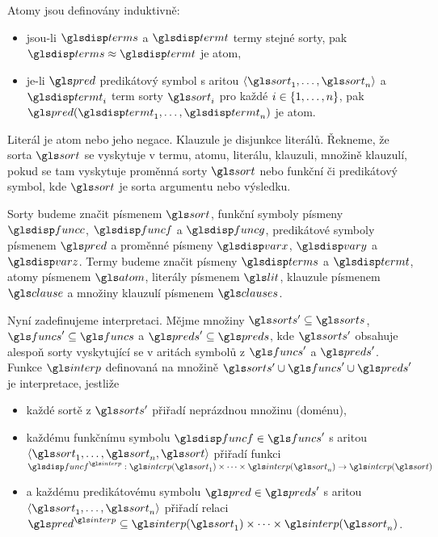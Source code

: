 Atomy jsou definovány induktivně:

\begin{itemize}
\item jsou-li $\termS$ a $\term$ termy stejné sorty,
  pak $\termS \approx \term$ je atom,
\item je-li $\pred$ predikátový symbol
  s aritou $\langle \sort_1 \comdots \sort_n \rangle$
  a $\term_i$ term sorty $\sort_i$ pro každé $i \in \{ 1 , \ldots, n \}$, pak
  $\pred(\term_1 \comdots \term_n)$ je atom.
\end{itemize}

Literál je atom nebo jeho negace. Klauzule je disjunkce literálů.
Řekneme, že sorta $\sort$ se vyskytuje v termu, atomu, literálu, klauzuli,
množině klauzulí, pokud se tam vyskytuje proměnná sorty $\sort$ nebo
funkční či predikátový symbol, kde $\sort$ je sorta argumentu nebo výsledku.


Sorty budeme značit písmenem $\sort$, funkční symboly písmeny
$\funcC$, $\func$ a $\funcG$, predikátové symboly písmenem $\pred$
a proměnné písmeny $\var$, $\varY$ a $\varZ$.
Termy budeme značit písmeny $\termS$ a $\term$, atomy písmenem $\atom$,
literály písmenem $\lit$, klauzule písmenem $\clause$ a množiny
klauzulí písmenem $\clauses$.

Nyní zadefinujeme interpretaci.
Mějme množiny $\sorts' \subseteq \sorts$, $\funcs' \subseteq \funcs$
a $\preds' \subseteq \preds$, kde $\sorts'$ obsahuje alespoň sorty
vyskytující se v aritách symbolů z $\funcs'$ a $\preds'$.
Funkce $\interp$ definovaná na množině $\sorts' \cup \funcs' \cup \preds'$
je interpretace, jestliže

\begin{itemize}
\item každé sortě z $\sorts'$ přiřadí neprázdnou množinu (doménu),
\item každému funkčnímu symbolu $\func \in \funcs'$ s aritou
  $\langle \sort_1 \comdots \sort_n, \sort \rangle$ přiřadí funkci
  $\func^\interp: \interp(\sort_1) \timdots \interp(\sort_n) \to
  \interp(\sort)$
\item a každému predikátovému symbolu $\pred \in \preds'$ s aritou
  $\langle \sort_1 \comdots \sort_n \rangle$ přiřadí relaci
  $\pred^\interp \subseteq \interp(\sort_1) \timdots \interp(\sort_n)$.
\end{itemize}

